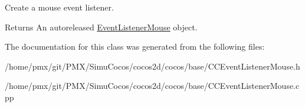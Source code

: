 Create a mouse event listener.

\begin{DoxyReturn}{Returns}
An autoreleased \hyperlink{classEventListenerMouse}{Event\+Listener\+Mouse} object. 
\end{DoxyReturn}


The documentation for this class was generated from the following files\+:\begin{DoxyCompactItemize}
\item 
/home/pmx/git/\+P\+M\+X/\+Simu\+Cocos/cocos2d/cocos/base/C\+C\+Event\+Listener\+Mouse.\+h\item 
/home/pmx/git/\+P\+M\+X/\+Simu\+Cocos/cocos2d/cocos/base/C\+C\+Event\+Listener\+Mouse.\+cpp\end{DoxyCompactItemize}

